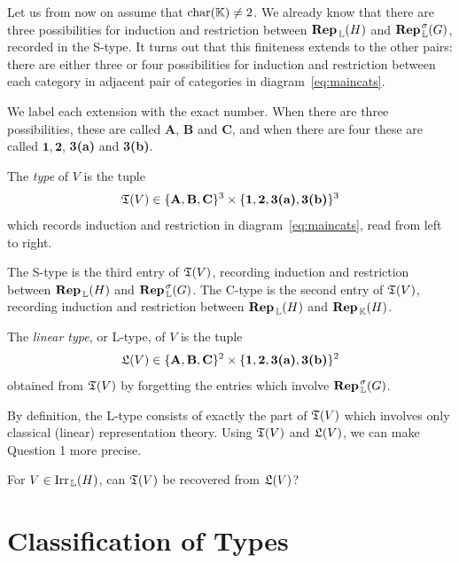 Let us from now on assume that $\operatorname{char}({\mathbb K}) \neq 2$.
We already know that there are three possibilities for induction and restriction between $\operatorname{\mathbf{Rep}}_{\, {\mathbb L}}(H)$ and $\operatorname{\mathbf{Rep}}_{\, {\mathbb L}}^{\hspace{0.1em}\sigma}(G)$, recorded in the S-type. It turns out that this finiteness extends to the other pairs: there are either three or four possibilities for induction and restriction between each category in adjacent pair of categories in diagram~\eqref{eq:maincats}.

We label each extension with the exact number. When there are three possibilities, these are called \textbf{A}, \textbf{B} and \textbf{C}, and when there are four these are called $\mathbf{1}, \mathbf{2}$, \textbf{3(a)} and \textbf{3(b)}.

\begin{definition*}
The \emph{type} of $V$ is the tuple
\[
{\mathfrak T}(V) \in \{\mathbf{A},\mathbf{B},\mathbf{C}\}^3 \times \{\text{\textbf{1}}, \text{\textbf{2}}, \text{\textbf{3(a)}}, \text{\textbf{3(b)}}\}^3
\]
which records induction and restriction in diagram~\eqref{eq:maincats}, read from left to right.
\end{definition*}

The S-type is the third entry of ${\mathfrak T}(V)$, recording induction and restriction between $\operatorname{\mathbf{Rep}}_{\, {\mathbb L}}(H)$ and $\operatorname{\mathbf{Rep}}_{\, {\mathbb L}}^{\hspace{0.1em}\sigma}(G)$. The C-type is the second entry of ${\mathfrak T}(V)$, recording induction and restriction between $\operatorname{\mathbf{Rep}}_{\, {\mathbb L}}(H)$ and $\operatorname{\mathbf{Rep}}_{\, {\mathbb K}}(H)$. 

\begin{definition*}
The \emph{linear type}, or L-type, of $V$ is the tuple
\[
{\mathfrak L}(V) \in \{\mathbf{A},\mathbf{B},\mathbf{C}\}^2 \times \{\text{\textbf{1}}, \text{\textbf{2}}, \text{\textbf{3(a)}}, \text{\textbf{3(b)}}\}^2
\]
obtained from ${\mathfrak T}(V)$ by forgetting the entries which involve $\operatorname{\mathbf{Rep}}_{\, {\mathbb L}}^{\hspace{0.1em}\sigma}(G)$.
\end{definition*}

By definition, the L-type consists of exactly the part of ${\mathfrak T}(V)$ which involves only classical (linear) representation theory.
Using ${\mathfrak T}(V)$ and ${\mathfrak L}(V)$, we can make Question 1 more precise.

\begin{question2*}
    For $V \in \operatorname{Irr}_{\, {\mathbb L}}(H)$, can ${\mathfrak T}(V)$ be recovered from ${\mathfrak L}(V)$?
\end{question2*}

\section*{Classification of Types}

